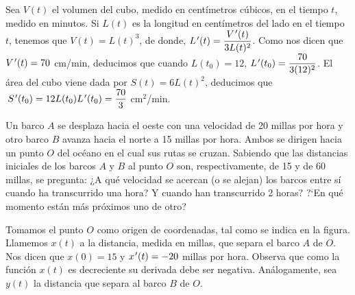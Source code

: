 \begin{ejercicios resueltos}
\sol Sea $V(t)$ el volumen del cubo, medido en centímetros cúbicos,
en el tiempo $t$, medido en minutos. Si $L(t)$ es la longitud en
centímetros del lado en el tiempo $t$, tenemos que $V(t)=L(t)^{3}$,
de donde, $L\mbox{$^{\mspace{2mu}\prime}$}(t)=\dfrac{V\mbox{$^{\mspace{2mu}\prime}$}(t)}{3L(t)^{2}}$. Como nos dicen que
$V\mbox{$^{\mspace{2mu}\prime}$}(t)=70$ cm/min, deducimos que cuando $L(t_{0})=12$, $L\mbox{$^{\mspace{2mu}\prime}$}(t_{0})=\dfrac{70}{3(12)^{2}}$.
El área del cubo viene dada por $S(t)=6L(t)^{2}$, deducimos que $\,S\mbox{$^{\mspace{2mu}\prime}$}(t_{0})=12L(t_{0})L\mbox{$^{\mspace{2mu}\prime}$}(t_{0})=\dfrac{70}{3}$
cm$^{2}$/min.\hecho

\resuelto Un barco $A$ se desplaza hacia el oeste con una velocidad
de 20 millas por hora y otro barco $B$ avanza hacia el norte a 15
millas por hora. Ambos se dirigen hacia un punto $O$ del océano en
el cual sus rutas se cruzan. Sabiendo que las distancias iniciales
de los barcos $A$ y $B$ al punto $O$ son, respectivamente, de 15
y de 60 millas, se pregunta: ¿A qué velocidad se acercan (o se alejan)
los barcos entre sí cuando ha transcurrido una hora? Y cuando han
transcurrido 2 horas? ?`En qué momento están más próximos uno de otro?

\sol Tomamos el punto $O$ como origen de coordenadas, tal como se
indica en la figura. Llamemos $x(t)$ a la distancia, medida en millas,
que separa el barco $A$ de $O$. Nos dicen que $x(0)=15$ y $x\mbox{$^{\mspace{2mu}\prime}$}(t)=-20$
millas por hora. Observa que como la función $x(t)$ es decreciente
su derivada debe ser negativa. Análogamente, sea $y(t)$ la distancia
que separa al barco $B$ de $O$.


\end{ejercicios resueltos}
